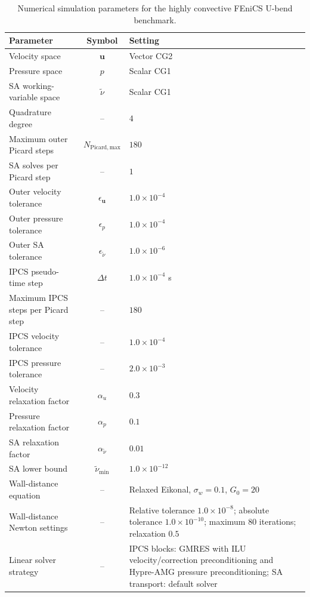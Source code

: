 \begin{table}[htbp]
	\centering
	\footnotesize
	\caption{Numerical simulation parameters for the highly convective FEniCS U-bend benchmark.}
	\label{tab:app_ubend_numerical}
	\renewcommand{\arraystretch}{1.2}
	\begin{tabularx}{\textwidth}{l c X}
		\hline
		\textbf{Parameter} & \textbf{Symbol} & \textbf{Setting} \\
		\hline
		Velocity space & $\mathbf{u}$ & Vector CG2 \\
		Pressure space & $p$ & Scalar CG1 \\
		SA working-variable space & $\tilde{\nu}$ & Scalar CG1 \\
		Quadrature degree & -- & $4$ \\
		Maximum outer Picard steps & $N_{\mathrm{Picard,max}}$ & $180$ \\
		SA solves per Picard step & -- & $1$ \\
		Outer velocity tolerance & $\epsilon_{\mathbf{u}}$ & $1.0 \times 10^{-4}$ \\
		Outer pressure tolerance & $\epsilon_p$ & $1.0 \times 10^{-4}$ \\
		Outer SA tolerance & $\epsilon_{\tilde{\nu}}$ & $1.0 \times 10^{-6}$ \\
		IPCS pseudo-time step & $\Delta t$ & $1.0 \times 10^{-4}$ s \\
		Maximum IPCS steps per Picard step & -- & $180$ \\
		IPCS velocity tolerance & -- & $1.0 \times 10^{-4}$ \\
		IPCS pressure tolerance & -- & $2.0 \times 10^{-3}$ \\
		Velocity relaxation factor & $\alpha_u$ & $0.3$ \\
		Pressure relaxation factor & $\alpha_p$ & $0.1$ \\
		SA relaxation factor & $\alpha_{\tilde{\nu}}$ & $0.01$ \\
		SA lower bound & $\tilde{\nu}_{\min}$ & $1.0 \times 10^{-12}$ \\
		Wall-distance equation & -- & Relaxed Eikonal, $\sigma_w=0.1$, $G_0=20$ \\
		Wall-distance Newton settings & -- & Relative tolerance $1.0 \times 10^{-8}$; absolute tolerance $1.0 \times 10^{-10}$; maximum $80$ iterations; relaxation $0.5$ \\
		Linear solver strategy & -- & IPCS blocks: GMRES with ILU velocity/correction preconditioning and Hypre-AMG pressure preconditioning; SA transport: default solver \\
		\hline
	\end{tabularx}
\end{table}

